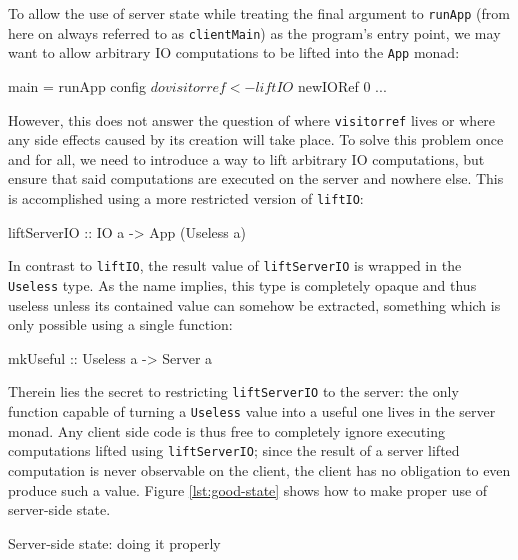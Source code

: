 \documentclass[preprint]{sigplanconf}
\begin{document}
To allow the use of server state while treating the final argument to
\lstinline!runApp! (from here on always referred to as \lstinline!clientMain!)
as the program's entry point, we may want to allow arbitrary IO computations to
be lifted into the \lstinline!App! monad:

\begin{code}
main = runApp config $ do
  visitorref <- liftIO $ newIORef 0
  ...
\end{code}

However, this does not answer the question of where \lstinline!visitorref!
lives or where any side effects caused by its creation will take place.
To solve this problem once and for all, we need to introduce a way to lift
arbitrary IO computations, but ensure that said computations are executed on
the server and nowhere else. This is accomplished using a more restricted
version of \lstinline!liftIO!:

\begin{code}
liftServerIO :: IO a -> App (Useless a)
\end{code}

In contrast to \lstinline!liftIO!, the result value of \lstinline!liftServerIO!
is wrapped in the \lstinline!Useless! type. As the name implies, this type is
completely opaque and thus useless unless its contained value can somehow be
extracted, something which is only possible using a single function:

\begin{code}
mkUseful :: Useless a -> Server a
\end{code}

Therein lies the secret to restricting \lstinline!liftServerIO! to the
server: the only function capable of turning a \lstinline!Useless! value into
a useful one lives in the server monad. Any client side code is thus free to
completely ignore executing computations lifted using \lstinline!liftServerIO!;
since the result of a server lifted computation is never observable on the
client, the client has no obligation to even produce such a value.
Figure \ref{lst:good-state} shows how to make proper use of server-side state.

\begin{listingfloat}
\caption{Server-side state: doing it properly}
\label{lst:good-state}
\end{listingfloat}
\end{document}
